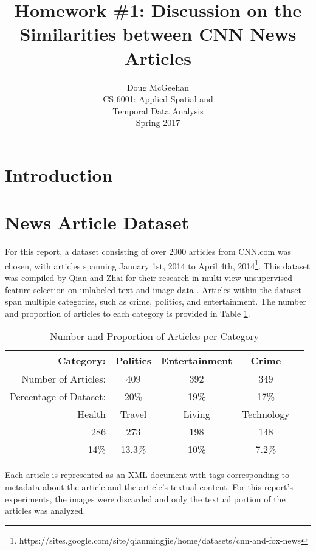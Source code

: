 \documentclass[11pt]{article}
\title{Homework \#1: Discussion on the Similarities between CNN News Articles}
\author{Doug McGeehan\\
		CS 6001: Applied Spatial and \\ Temporal Data Analysis\\
		Spring 2017}
\begin{document}
\maketitle

\section{Introduction}


\section{News Article Dataset}

For this report, a dataset consisting of over 2000 articles from CNN.com was chosen, with articles spanning January 1st, 2014 to April 4th, 2014\footnote{
https://sites.google.com/site/qianmingjie/home/datasets/cnn-and-fox-news
}.
This dataset was compiled by Qian and Zhai for their research in multi-view unsupervised feature selection on unlabeled text and image data \cite{qian2014unsupervised}.
Articles within the dataset span multiple categories, such as crime, politics, and entertainment.
The number and proportion of articles to each category is provided in Table \ref{table:categories}.

\begin{table}[h]
	\centering
	\begin{tabular}{ r c c c c  }
		\hline
	Category: &              Politics & Entertainment & Crime & \\ \hline
	Number of Articles: &    409 &      392 &           349 & \\ \hline
	Percentage of Dataset: & 20\% &    19\% &           17\% & \\
	  \hline
	  \hline
	   Health & Travel & Living & Technology \\ \hline
	   286    & 273    & 198    & 148 \\ \hline
	   14\%   & 13.3\% & 10\%   & 7.2\% \\
	\hline
	\end{tabular}
	
	\caption{Number and Proportion of Articles per Category}
	\label{table:categories}
\end{table}

Each article is represented as an XML document with tags corresponding to metadata about the article and the article's textual content.
For this report's experiments, the images were discarded and only the textual portion of the articles was analyzed.
\end{document}
